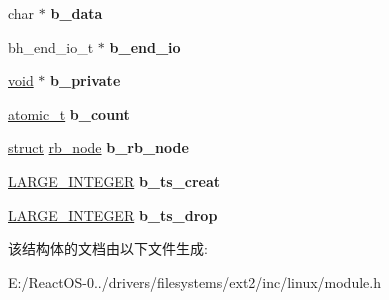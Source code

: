 \begin{DoxyCompactItemize}
\mbox{\label{structbuffer__head_af6df18ba0e6d99b48860f0721cfa287a}} 
char $\ast$ {\bfseries b\+\_\+data}
\item 
\mbox{\label{structbuffer__head_a91ddf2b04118f4083917282e04ed8788}} 
bh\+\_\+end\+\_\+io\+\_\+t $\ast$ {\bfseries b\+\_\+end\+\_\+io}
\item 
\mbox{\label{structbuffer__head_a49f59edacae00840b27cadae8e35a693}} 
\hyperlink{interfacevoid}{void} $\ast$ {\bfseries b\+\_\+private}
\item 
\mbox{\label{structbuffer__head_aaa53c0448a77ae7ca1a8102ef9b7391c}} 
\hyperlink{structatomic__t}{atomic\+\_\+t} {\bfseries b\+\_\+count}
\item 
\mbox{\label{structbuffer__head_a229d3b8d0af027fa70a71974f6a49232}} 
\hyperlink{interfacestruct}{struct} \hyperlink{structrb__node}{rb\+\_\+node} {\bfseries b\+\_\+rb\+\_\+node}
\item 
\mbox{\label{structbuffer__head_a86c44a407114f381c499c599643880fe}} 
\hyperlink{union___l_a_r_g_e___i_n_t_e_g_e_r}{L\+A\+R\+G\+E\+\_\+\+I\+N\+T\+E\+G\+ER} {\bfseries b\+\_\+ts\+\_\+creat}
\item 
\mbox{\label{structbuffer__head_afb6ba22434df08d1e98154897b68c483}} 
\hyperlink{union___l_a_r_g_e___i_n_t_e_g_e_r}{L\+A\+R\+G\+E\+\_\+\+I\+N\+T\+E\+G\+ER} {\bfseries b\+\_\+ts\+\_\+drop}
\end{DoxyCompactItemize}


该结构体的文档由以下文件生成\+:\begin{DoxyCompactItemize}
\item 
E\+:/\+React\+O\+S-\/0../drivers/filesystems/ext2/inc/linux/module.\+h\end{DoxyCompactItemize}
